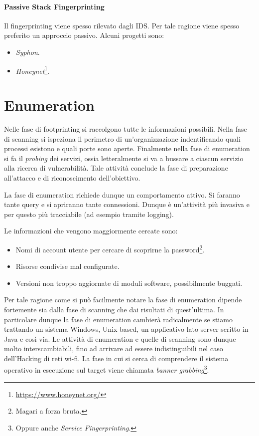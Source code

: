 \documentclass[14pt]{extreport}
\begin{document}
\subsubsection{Passive Stack Fingerprinting}

Il fingerprinting viene spesso rilevato dagli IDS. Per tale ragione viene spesso preferito un approccio passivo. Alcuni progetti sono:

\begin{itemize}
    \item \textit{Syphon}.
    \item \textit{Honeynet}\footnote{\url{https://www.honeynet.org/}}. 
\end{itemize}





\chapter{Enumeration}
Nelle fase di footprinting si raccolgono tutte le informazioni possibili. Nella fase di scanning si ispeziona il perimetro di un'organizzazione indentificando quali processi esistono e quali porte sono aperte. Finalmente nella fase di enumeration si fa il \textit{probing} dei servizi, ossia letteralmente si va a bussare a ciascun servizio alla ricerca di vulnerabilità. Tale attività conclude la fase di preparazione all'attacco e di riconoscimento dell'obiettivo. 


La fase di enumeration richiede dunque un comportamento attivo. Si faranno tante query e si apriranno tante connessioni. Dunque è un'attività più invasiva e per questo più tracciabile (ad esempio tramite logging).

Le informazioni che vengono maggiormente cercate sono:


\begin{itemize}
    \item Nomi di account utente per cercare di scoprirne la password\footnote{Magari a forza bruta.}.
    
    \item Risorse condivise mal configurate.
    
    \item Versioni non troppo aggiornate di moduli software, possibilmente buggati.
\end{itemize}


Per tale ragione come si può facilmente notare la fase di enumeration dipende fortemente sia dalla fase di scanning che dai risultati di quest'ultima. In particolare dunque la fase di enumeration cambierà radicalmente se stiamo trattando un sistema Windows, Unix-based, un applicativo lato server scritto in Java e così via.
Le attività di enumeration e quelle di scanning sono dunque molto interscambiabili, fino ad arrivare ad essere indistinguibili nel caso dell'Hacking di reti wi-fi.
La fase in cui si cerca di comprendere il sistema operativo in esecuzione sul target viene chiamata \textit{banner grabbing}\footnote{Oppure anche \textit{Service Fingerprinting}.}.
\end{document}
